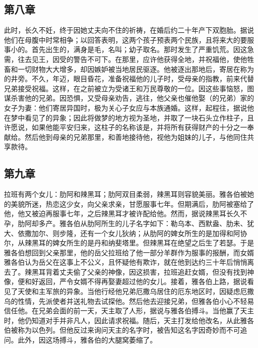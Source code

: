 
\subsection{第八章}

此时，长久不妊，终于因她丈夫向不住的祈祷，在婚后约二十年产下双胞胎。据说他们在母腹中时常相争；以回答表明，这两个孩子预表两个民族，且将来大的要服事小的。首先出生的，满身是毛，名叫；幼子取名。那时发生了严重饥荒。因这急需，往去见王，因受的警告不可下。在那里，应许他获得全地，并祝福他，使他牲畜和一切财物大大增多，却因嫉妒被当地居民驱逐。他被逐出那地后，寄居在称为的井旁。不久，年迈，眼目昏花，准备祝福他的儿子时，受母亲的指教，前来代替兄弟接受祝福。这样，在之前被立为受诸王和万民尊敬的一位。因这些事恼怒，图谋杀害他的兄弟。因恐惧，又受母亲劝告，逃往，他父亲也催他娶（的兄弟）家的女子为妻：他们寄居异国时，极为关心子女应与本族通婚。这样，起程往，据说他在梦中看见了的异象；因此将做梦的地方视为圣地，并取了一块石头立作柱子，且许愿说，如果他能平安归来，这柱子的名称该是，并将所有获得财产的十分之一奉献给。然后他到母亲的兄弟那里，和善地接待他，视他为姐妹的儿子，与他同住共享款待。\par


\subsection{第九章}

拉班有两个女儿：肋阿和辣黑耳；肋阿双目柔弱，辣黑耳则容貌美丽。雅各伯被她的美貌所迷，热恋这少女，向父亲求亲，甘愿服事七年。但期满后，肋阿被塞给了他，他又被迫再服事七年，之后辣黑耳才被许配给他。然而，据说辣黑耳长久不孕，肋阿却多产。雅各伯从肋阿所生的儿子名字如下：勒乌本、西默盎、肋未、犹大、依撒加尔、则步隆，还有一个女儿狄纳；从肋阿的婢女所生的是加得和阿协尔，从辣黑耳的婢女所生的是丹和纳斐塔里。但辣黑耳在绝望之后生了若瑟。于是雅各伯想回到父亲那里，他的岳父拉班给了他一部分羊群作为服事的报酬，而女婿雅各伯认为岳父在这事上不公义，且怀疑他有欺诈，就在他到达约三十年后悄悄离去了。辣黑耳背着丈夫偷了父亲的神像，因这损害，拉班追赶女婿，但没有找到神像，便和好返回，严令女婿不得再娶妻超过他的女儿。接着，雅各伯上路，据说看见了天使和主军旅的异象。当他行经他兄弟厄撒乌居住的厄东地区时，因疑虑厄撒乌的性情，先派使者并送礼物去试探他。然后他去迎接兄弟，但雅各伯小心不轻易信任他。在兄弟会面的前一天，天主取了人形，据说与雅各伯搏斗。当他赢了天主时，他仍知道对手并非凡人，因此请求祝福。随后，天主打发给他改名，从此雅各伯被称为以色列。但他反过来询问天主的名字时，被告知这名字因奇妙而不可追问。此外，因这场搏斗，雅各伯的大腿窝萎缩了。\par

